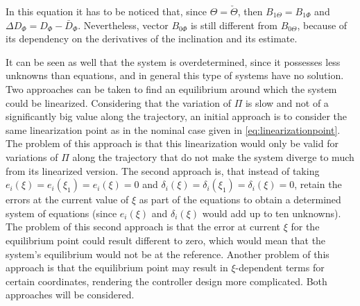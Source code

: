 \documentclass[../main.tex]{subfiles}
\begin{document}
In this equation it has to be noticed that, since $\Theta = \check{\Theta}$, then $B_{1\Theta} = B_{1\Phi}$ and $\Delta D_\Phi = D_\Phi - \bar{D}_\Phi$. Nevertheless, vector $B_{0\Phi}$ is still different from $B_{0\Theta}$, because of its dependency on the derivatives of the inclination and its estimate. 

It can be seen as well that the system is overdetermined, since it possesses less unknowns than equations, and in general this type of systems have no solution. Two approaches can be taken to find an equilibrium around which the system could be linearized. Considering that the variation of $\Pi$ is slow and not of a significantly big value along the trajectory, an initial approach is to consider the same linearization point as in the nominal case given in \eqref{eq:linearizationpoint}. The problem of this approach is that this linearization would only be valid for variations of $\Pi$ along the trajectory that do not make the system diverge to much from its linearized version. The second approach is, that instead of taking $e_i (\xi) = e_i (\xi_1) = e_i (\xi) = 0$ and $\delta_i (\xi) = \delta_i (\xi_1) = \delta_i (\xi) = 0$, retain the errors at the current value of $\xi$ as part of the equations to obtain a determined system of equations (since $e_i(\xi)$ and $\delta_i(\xi)$ would add up to ten unknowns). The problem of this second approach is that the error at current $\xi$ for the equilibrium point could result different to zero, which would mean that the system's equilibrium would not be at the reference. Another problem of this approach is that the equilibrium point may result in $\xi$-dependent terms for certain coordinates, rendering the controller design more complicated. Both approaches will be considered.
\end{document}
